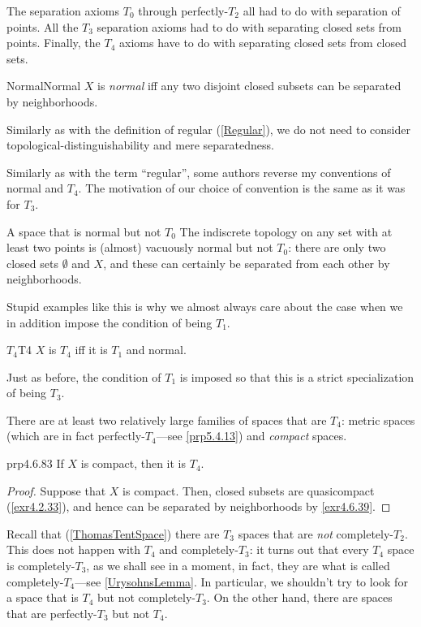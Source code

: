 The separation axioms $T_0$ through perfectly-$T_2$ all had to do with separation of points.  All the $T_3$ separation axioms had to do with separating closed sets from points.  Finally, the $T_4$ axioms have to do with separating closed sets from closed sets.
\begin{dfn}{Normal}{Normal}
$X$ is \emph{normal} iff any two disjoint closed subsets can be separated by neighborhoods.
\begin{rmk}
Similarly as with the definition of regular (\cref{Regular}), we do not need to consider topological-distinguishability and mere separatedness.
\end{rmk}
\begin{rmk}
Similarly as with the term ``regular'', some authors reverse my conventions of normal and $T_4$.  The motivation of our choice of convention is the same as it was for $T_3$.
\end{rmk}
\end{dfn}
\begin{exm}{A space that is normal but not $T_0$}{}
The indiscrete topology on any set with at least two points is (almost) vacuously normal but not $T_0$:  there are only two closed sets $\emptyset$ and $X$, and these can certainly be separated from each other by neighborhoods.
\end{exm}
Stupid examples like this is why we almost always care about the case when we in addition impose the condition of being $T_1$.
\begin{dfn}{$T_4$}{T4}
$X$ is \emph{$T_4$} iff it is $T_1$ and normal.
\begin{rmk}
Just as before, the condition of $T_1$ is imposed so that this is a strict specialization of being $T_3$.
\end{rmk}
\end{dfn}
There are at least two relatively large families of spaces that are $T_4$:  metric spaces (which are in fact perfectly-$T_4$---see \cref{prp5.4.13}) and \emph{compact} spaces.
\begin{prp}{}{prp4.6.83}
If $X$ is compact, then it is $T_4$.
\begin{proof}
Suppose that $X$ is compact.  Then, closed subsets are quasicompact (\cref{exr4.2.33}), and hence can be separated by neighborhoods by \cref{exr4.6.39}.
\end{proof}
\end{prp}
Recall that (\cref{ThomasTentSpace}) there are $T_3$ spaces that are \emph{not} completely-$T_2$.  This does not happen with $T_4$ and completely-$T_3$:  it turns out that every $T_4$ space is completely-$T_3$, as we shall see in a moment, in fact, they are what is called completely-$T_4$---see \cref{UrysohnsLemma}.  In particular, we shouldn't try to look for a space that is $T_4$ but not completely-$T_3$.  On the other hand, there are spaces that are perfectly-$T_3$ but not $T_4$.
